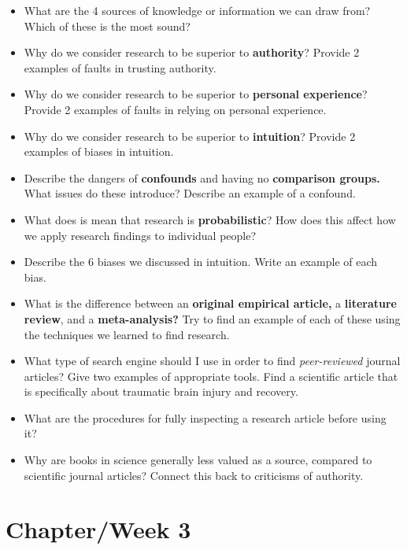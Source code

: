 \documentclass[
  12pt,
  letterpaper,
]{scrartcl}
\begin{document}
\begin{itemize}
\item
  What are the 4 sources of knowledge or information we can draw from?
  Which of these is the most sound?
\item
  Why do we consider research to be superior to \textbf{authority}?
  Provide 2 examples of faults in trusting authority.
\item
  Why do we consider research to be superior to \textbf{personal
  experience}? Provide 2 examples of faults in relying on personal
  experience.
\item
  Why do we consider research to be superior to \textbf{intuition}?
  Provide 2 examples of biases in intuition.
\item
  Describe the dangers of \textbf{confounds} and having no
  \textbf{comparison groups.} What issues do these introduce? Describe
  an example of a confound.
\item
  What does is mean that research is \textbf{probabilistic}? How does
  this affect how we apply research findings to individual people?
\item
  Describe the 6 biases we discussed in intuition. Write an example of
  each bias.
\item
  What is the difference between an \textbf{original empirical article,}
  a \textbf{literature review}, and a \textbf{meta-analysis?} Try to
  find an example of each of these using the techniques we learned to
  find research.
\item
  What type of search engine should I use in order to find
  \emph{peer-reviewed} journal articles? Give two examples of
  appropriate tools. Find a scientific article that is specifically
  about traumatic brain injury and recovery.
\item
  What are the procedures for fully inspecting a research article before
  using it?
\item
  Why are books in science generally less valued as a source, compared
  to scientific journal articles? Connect this back to criticisms of
  authority.
\end{itemize}

\section{Chapter/Week 3}\label{sec-ch-3}
\end{document}
